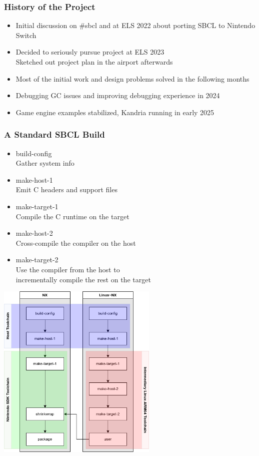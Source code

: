 \documentclass[14pt,t,aspectratio=169]{beamer}
\begin{document}
\begin{frame}
  \frametitle{History of the Project}
  \begin{itemize}
  \item Initial discussion on \#sbcl and at ELS 2022 about porting SBCL
    to Nintendo Switch \\
  \item Decided to seriously pursue project at ELS 2023 \\
    \Rightarrow{} Sketched out project plan in the airport afterwards
  \item Most of the initial work and design problems solved in the
    following months \\
  \item Debugging GC issues and improving debugging experience in
    2024 \\
  \item Game engine examples stabilized, Kandria running in early 2025 \\
  \end{itemize}
\end{frame}

\begin{frame}
  \frametitle{A Standard SBCL Build}
  \begin{itemize}
  \item build-config \\
    \Rightarrow{} Gather system info
  \item make-host-1 \\
    \Rightarrow{} Emit C headers and support files
  \item make-target-1 \\
    \Rightarrow{} Compile the C runtime on the target
  \item make-host-2 \\
    \Rightarrow{} Cross-compile the compiler on the host
  \item make-target-2 \\
    \Rightarrow{} Use the compiler from the host to\\ incrementally compile the rest on the target
  \end{itemize}
\end{frame}

\begin{frame}
  \includegraphics[height=8.5cm]{build.png}
\end{frame}
\end{document}
